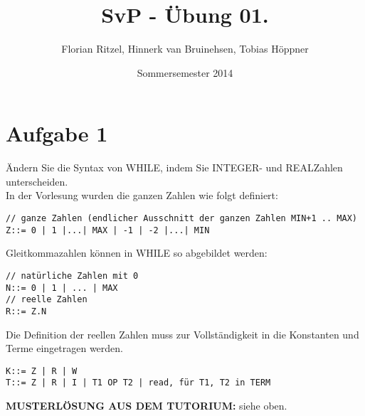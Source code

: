 \documentclass[ngerman,a4paper]{report}
\author{Florian Ritzel, Hinnerk van Bruinehsen, Tobias Höppner}
\title{SvP - Übung 01. }
\date{Sommersemester 2014}
\renewcommand{\maketitle}{}
\begin{document}
 
\maketitle 
\section*{Aufgabe 1}
Ändern Sie die Syntax von WHILE, indem Sie INTEGER- und REALZahlen unterscheiden.\\
In der Vorlesung wurden die ganzen Zahlen wie folgt definiert:
\begin{lstlisting}
// ganze Zahlen (endlicher Ausschnitt der ganzen Zahlen MIN+1 .. MAX)
Z::= 0 | 1 |...| MAX | -1 | -2 |...| MIN 
\end{lstlisting}
Gleitkommazahlen können in WHILE so abgebildet werden:
\begin{lstlisting}
// natürliche Zahlen mit 0
N::= 0 | 1 | ... | MAX
// reelle Zahlen
R::= Z.N
\end{lstlisting}
Die Definition der reellen Zahlen muss zur Vollständigkeit in die Konstanten und Terme eingetragen werden.
\begin{lstlisting}
K::= Z | R | W
T::= Z | R | I | T1 OP T2 | read, für T1, T2 in TERM
\end{lstlisting}
\textbf{MUSTERLÖSUNG AUS DEM TUTORIUM:}
siehe oben.\\
\end{document}
